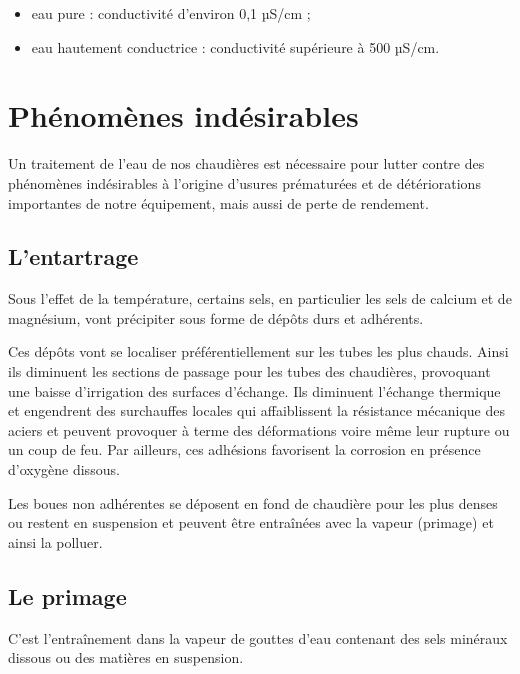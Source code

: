 \begin{itemize}
\item eau pure : conductivité d'environ 0,1 µS/cm ;
\item eau hautement conductrice : conductivité supérieure à 500 µS/cm.
\end{itemize}


\section{	Phénomènes indésirables}

Un traitement de l’eau de nos chaudières est nécessaire pour lutter contre des phénomènes indésirables à l’origine d’usures prématurées et de détériorations importantes de notre équipement, mais aussi de perte de rendement.



\subsection{L’entartrage}

Sous l’effet de la température, certains sels, en particulier les sels de calcium et de magnésium, vont précipiter sous forme de dépôts durs et adhérents.
\vspace{0.3cm}

Ces dépôts vont se localiser préférentiellement sur les tubes les plus chauds. Ainsi ils diminuent les sections de passage pour les tubes des chaudières, provoquant une baisse d’irrigation des surfaces d’échange. Ils diminuent l’échange thermique et engendrent des surchauffes locales qui affaiblissent la résistance mécanique des aciers et peuvent provoquer à terme des déformations voire même leur rupture ou un coup de feu.
Par ailleurs, ces adhésions favorisent la corrosion en présence d’oxygène dissous.
\vspace{0.3cm}

Les boues non adhérentes se déposent en fond de chaudière pour les plus denses ou restent en suspension et peuvent être entraînées avec la vapeur (primage) et ainsi la polluer.

\subsection{Le primage}

C’est l’entraînement dans la vapeur de gouttes d’eau contenant des sels minéraux dissous ou des matières en suspension.
\vspace{0.3cm}

